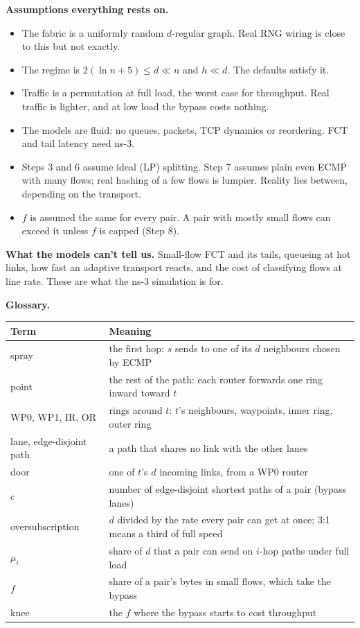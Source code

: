 \documentclass[11pt]{article}
\begin{document}
\textbf{Assumptions everything rests on.}
\begin{itemize}
  \item The fabric is a uniformly random $d$-regular graph. Real RNG wiring is close to this but not exactly.
  \item The regime is $2(\ln n + 5) \le d \ll n$ and $h \ll d$. The defaults satisfy it.
  \item Traffic is a permutation at full load, the worst case for throughput. Real traffic is lighter, and at low load the bypass costs nothing.
  \item The models are fluid: no queues, packets, TCP dynamics or reordering. FCT and tail latency need ns-3.
  \item Steps 3 and 6 assume ideal (LP) splitting. Step 7 assumes plain even ECMP with many flows; real hashing of a few flows is lumpier. Reality lies between, depending on the transport.
  \item $f$ is assumed the same for every pair. A pair with mostly small flows can exceed it unless $f$ is capped (Step 8).
\end{itemize}

\textbf{What the models can't tell us.} Small-flow FCT and its tails, queueing at hot links, how fast an adaptive transport reacts, and the cost of classifying flows at line rate. These are what the ns-3 simulation is for.

\textbf{Glossary.}

\begin{center}
\begin{tabularx}{\linewidth}{@{}l L@{}}
\toprule
Term & Meaning \\
\midrule
spray & the first hop: $s$ sends to one of its $d$ neighbours chosen by ECMP \\
point & the rest of the path: each router forwards one ring inward toward $t$ \\
WP0, WP1, IR, OR & rings around $t$: $t$'s neighbours, waypoints, inner ring, outer ring \\
lane, edge-disjoint path & a path that shares no link with the other lanes \\
door & one of $t$'s $d$ incoming links, from a WP0 router \\
$c$ & number of edge-disjoint shortest paths of a pair (bypass lanes) \\
oversubscription & $d$ divided by the rate every pair can get at once; 3:1 means a third of full speed \\
$\mu_i$ & share of $d$ that a pair can send on $i$-hop paths under full load \\
$f$ & share of a pair's bytes in small flows, which take the bypass \\
knee & the $f$ where the bypass starts to cost throughput \\
\bottomrule
\end{tabularx}
\end{center}
\end{document}
